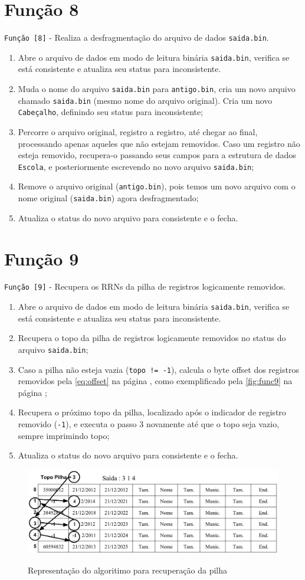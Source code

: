 \documentclass[
	12pt,				%
	openany,			%
	twoside,			%
	a4paper,			%
	english,			%
	french,				%
	spanish,			%
	brazil,				%
	]{abntex2}
\begin{document}
\section{Função 8}
\verb|Função [8]| - Realiza a desfragmentação do arquivo de dados \verb|saida.bin|.
\begin{enumerate}
    \item Abre o arquivo de dados em modo de leitura binária \verb|saida.bin|, verifica se está consistente e atualiza seu status para inconsistente.
    \item Muda o nome do arquivo \verb|saida.bin| para \verb|antigo.bin|, cria um novo arquivo chamado \verb|saida.bin| (mesmo nome do arquivo original). Cria um novo \verb|Cabeçalho|, definindo seu status para inconsistente;
    \item Percorre o arquivo original, registro a registro, até chegar ao final, processando apenas aqueles que não estejam removidos. Caso um registro não esteja removido, recupera-o passando seus campos para a estrutura de dados \verb|Escola|, e posteriormente escrevendo no novo arquivo \verb|saida.bin|;
    \item Remove o arquivo original (\verb|antigo.bin|), pois temos um novo arquivo com o nome original (\verb|saida.bin|) agora desfragmentado;
    \item Atualiza o status do novo arquivo para consistente e o fecha.
\end{enumerate}

\section{Função 9}
\verb|Função [9]| - Recupera os RRNs da pilha de registros logicamente removidos.
\begin{enumerate}
    \item Abre o arquivo de dados em modo de leitura binária \verb|saida.bin|, verifica se está consistente e atualiza seu status para inconsistente.
    \item Recupera o topo da pilha de registros logicamente removidos no status do arquivo \verb|saida.bin|;
    \item Caso a pilha não esteja vazia (\verb|topo != -1|), calcula o byte offset dos registros removidos pela \autoref{eq:offset} na página \pageref{eq:offset}, como exemplificado pela \autoref{fig:func9} na página \pageref{fig:func9};
    \item Recupera o próximo topo da pilha, localizado após o indicador de registro removido (\verb|-1|), e executa o passo 3 novamente até que o topo seja vazio, sempre imprimindo topo;
    \item Atualiza o status do novo arquivo para consistente e o fecha.
\end{enumerate}

\begin{figure}[ht]
    \centering
    \caption{Representação do algoritimo para recuperação da pilha}
    \includegraphics[width=\textwidth]{func9.png}
    \label{fig:func9}
\end{figure}
\end{document}
